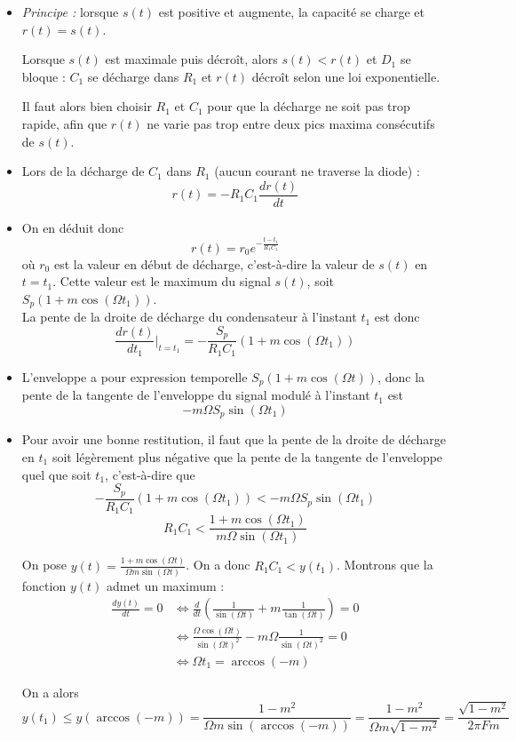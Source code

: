 \documentclass[../../Cours_M1.tex]{subfiles}
\begin{document}
\begin{itemize}
\item \emph{Principe :} lorsque $s(t)$ est positive et augmente, la capacité se charge et $r(t) = s(t)$.

Lorsque $s(t)$ est maximale puis décroît, alors $s(t) < r(t)$ et $D_1$ se bloque : $C_1$ se décharge dans $R_1$ et $r(t)$ décroît selon une loi exponentielle.

Il faut alors bien choisir $R_1$ et $C_1$ pour que la décharge ne soit pas trop rapide, afin que $r(t)$ ne varie pas trop entre deux pics maxima consécutifs de $s(t)$. 
\item Lors de la décharge de $C_1$ dans $R_1$ (aucun courant ne traverse la diode) :
\[ r(t) = -R_1C_1\frac{dr(t)}{dt} \]
\item On en déduit donc
\[ r(t) = r_0e^{-\frac{t-t_1}{R_1C_1}} \] où $r_0$ est la valeur en début de décharge, c'est-à-dire la valeur de $s(t)$ en $t=t_1$. Cette valeur est le maximum du signal $s(t)$, soit $S_p(1+m\cos(\Omega t_1))$. \\
La pente de la droite de décharge du condensateur à l'instant $t_1$ est donc \[\frac{dr(t)}{dt_1}|_{t=t_1}= -\frac{S_p}{R_1C_1}(1+m\cos(\Omega t_1))\]
\item L'enveloppe a pour expression temporelle $S_p(1+m\cos(\Omega t))$, donc la pente de la tangente de l'enveloppe du signal modulé à l'instant $t_1$ est
\[-m\Omega S_p\sin(\Omega t_1)\]
\item Pour avoir une bonne restitution, il faut que la pente de la droite de décharge  en $t_1$ soit légèrement plus négative que la pente de la tangente de l'enveloppe quel que soit $t_1$, c'est-à-dire que
\[-\frac{S_p}{R_1C_1}(1+m\cos(\Omega t_1))<-m\Omega S_p\sin(\Omega t_1)\]
\[R_1C_1 < \frac{1+m\cos(\Omega t_1)}{m\Omega\sin(\Omega t_1)}\]

On pose $y(t) = \frac{1+m\cos(\Omega t)}{\Omega m \sin(\Omega t)}$. On a donc $R_1C_1 < y(t_1)$. Montrons que la fonction $y(t)$ admet un maximum :
\begin{align*}
\frac{dy(t)}{dt} = 0 & \Leftrightarrow \frac{d}{dt}(\frac{1}{\sin(\Omega t)} + m\frac{1}{\tan(\Omega t)}) = 0 \\
& \Leftrightarrow \frac{\Omega \cos(\Omega t)}{\sin(\Omega t)^2} - m \Omega \frac{1}{\sin(\Omega t)^2} =0 \\
& \Leftrightarrow \Omega t_1 = \arccos(-m)  
\end{align*}

On a alors  \[y(t_1) \leq y(\arccos(-m)) = \frac{1-m^2}{\Omega m \sin(\arccos(-m))} = \frac{1-m^2}{\Omega m \sqrt{1-m^2}} = \frac{\sqrt{1-m^2}}{2\pi Fm}\]


\end{itemize}
\end{document}
